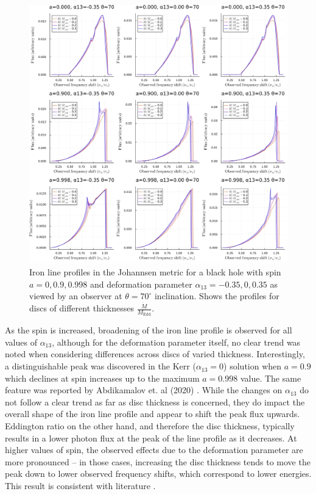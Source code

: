 \documentclass[fleqn,usenatbib,useAMS]{mnras}
\begin{document}
\begin{figure}[h!]
    \centering
    \includegraphics[width=\linewidth]{figures/abdi70.png}
    \caption{Iron line profiles in the Johannsen metric for a black hole with spin $a = 0, 0.9, 0.998$ and deformation parameter $\alpha_{13} = -0.35, 0, 0.35$ as viewed by an observer at $\theta = 70^{\circ}$ inclination. Shows the profiles for discs of different thicknesses $\frac{\dot M}{M_{\text{Edd}}}$.}
    \label{abdi70}
\end{figure}

As the spin is increased, broadening of the iron line profile is observed for all values of $\alpha_{13}$, although for the deformation parameter itself, no clear trend was noted when considering differences across discs of varied thickness. Interestingly, a distinguishable peak was discovered in the Kerr ($\alpha_{13} = 0$) solution when $a = 0.9$ which declines at spin increases up to the maximum $a = 0.998$ value. The same feature was reported by Abdikamalov et. al (2020) \cite{abdikamalov2020testing}. While the changes on $\alpha_{13}$ do not follow a clear trend as far as disc thickness is concerned, they do impact the overall shape of the iron line profile and appear to shift the peak flux upwards. Eddington ratio on the other hand, and therefore the disc thickness, typically results in a lower photon flux at the peak of the line profile as it decreases. At higher values of spin, the observed effects due to the deformation parameter are more pronounced -- in those cases, increasing the disc thickness tends to move the peak down to lower observed frequency shifts, which correspond to lower energies. This result is consistent with literature \cite{abdikamalov2020testing}.
\end{document}
